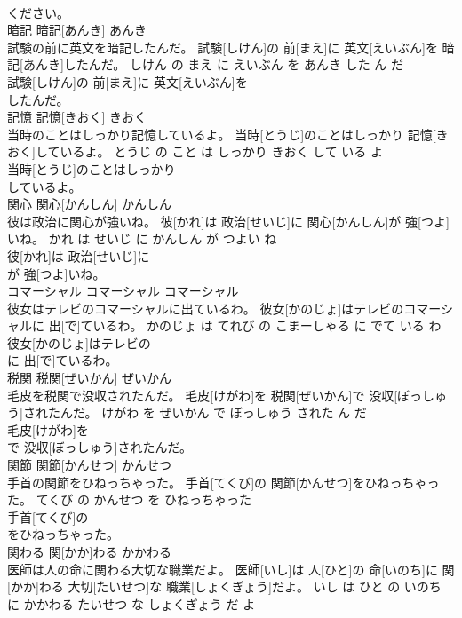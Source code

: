 \documentclass[8pt]{extreport}
\begin{document}
\begin{CJK}{UTF8}{min}
\\	ください。			
\\	暗記	暗記[あんき]	あんき	
\\	試験の前に英文を暗記したんだ。	試験[しけん]の 前[まえ]に 英文[えいぶん]を 暗記[あんき]したんだ。	しけん の まえ に えいぶん を あんき した ん だ	
\\	試験[しけん]の 前[まえ]に 英文[えいぶん]を
\\	したんだ。			
\\	記憶	記憶[きおく]	きおく	
\\	当時のことはしっかり記憶しているよ。	当時[とうじ]のことはしっかり 記憶[きおく]しているよ。	とうじ の こと は しっかり きおく して いる よ	
\\	当時[とうじ]のことはしっかり
\\	しているよ。			
\\	関心	関心[かんしん]	かんしん	
\\	彼は政治に関心が強いね。	彼[かれ]は 政治[せいじ]に 関心[かんしん]が 強[つよ]いね。	かれ は せいじ に かんしん が つよい ね	
\\	彼[かれ]は 政治[せいじ]に
\\	が 強[つよ]いね。			
\\	コマーシャル	コマーシャル	コマーシャル	
\\	彼女はテレビのコマーシャルに出ているわ。	彼女[かのじょ]はテレビのコマーシャルに 出[で]ているわ。	かのじょ は てれび の こまーしゃる に でて いる わ	
\\	彼女[かのじょ]はテレビの
\\	に 出[で]ているわ。			
\\	税関	税関[ぜいかん]	ぜいかん	
\\	毛皮を税関で没収されたんだ。	毛皮[けがわ]を 税関[ぜいかん]で 没収[ぼっしゅう]されたんだ。	けがわ を ぜいかん で ぼっしゅう された ん だ	
\\	毛皮[けがわ]を
\\	で 没収[ぼっしゅう]されたんだ。			
\\	関節	関節[かんせつ]	かんせつ	
\\	手首の関節をひねっちゃった。	手首[てくび]の 関節[かんせつ]をひねっちゃった。	てくび の かんせつ を ひねっちゃった	
\\	手首[てくび]の
\\	をひねっちゃった。			
\\	関わる	関[かか]わる	かかわる	
\\	医師は人の命に関わる大切な職業だよ。	医師[いし]は 人[ひと]の 命[いのち]に 関[かか]わる 大切[たいせつ]な 職業[しょくぎょう]だよ。	いし は ひと の いのち に かかわる たいせつ な しょくぎょう だ よ	

\end{CJK}
\end{document}
